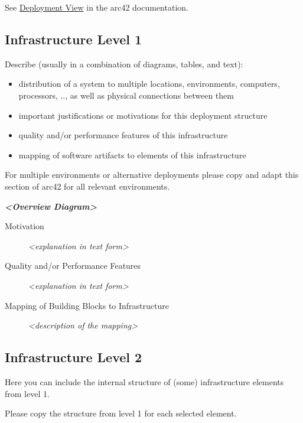 See \href{https://docs.arc42.org/section-7/}{Deployment View} in the
arc42 documentation.

\hypertarget{_infrastructure_level_1}{%
\subsection{Infrastructure Level 1}\label{_infrastructure_level_1}}

Describe (usually in a combination of diagrams, tables, and text):

\begin{itemize}
\item
  distribution of a system to multiple locations, environments,
  computers, processors, .., as well as physical connections between
  them
\item
  important justifications or motivations for this deployment structure
\item
  quality and/or performance features of this infrastructure
\item
  mapping of software artifacts to elements of this infrastructure
\end{itemize}

For multiple environments or alternative deployments please copy and
adapt this section of arc42 for all relevant environments.

\emph{\textbf{\textless Overview Diagram\textgreater{}}}

\begin{description}
\item[Motivation]
\emph{\textless explanation in text form\textgreater{}}
\item[Quality and/or Performance Features]
\emph{\textless explanation in text form\textgreater{}}
\item[Mapping of Building Blocks to Infrastructure]
\emph{\textless description of the mapping\textgreater{}}
\end{description}

\hypertarget{_infrastructure_level_2}{%
\subsection{Infrastructure Level 2}\label{_infrastructure_level_2}}

Here you can include the internal structure of (some) infrastructure
elements from level 1.

Please copy the structure from level 1 for each selected element.


